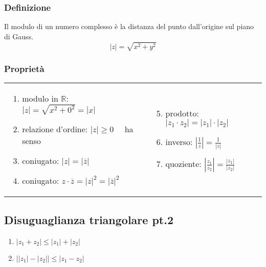 \documentclass[a4paper]{article}
\begin{document}
\subsubsection*{Definizione}
Il modulo di un numero complesso è la distanza del punto dall'origine sul piano di Gauss.
\[ \left| z \right| = \sqrt{x^2 + y^2}\]

\subsubsection*{Proprietà}
\begin{center}
	\begin{tabular}{m{7cm} m{7cm}}
		\begin{enumerate}
			\item modulo in \(\mathbb{R}\): \(\left| z \right| = \sqrt{x^2 + 0^2} = \left| x \right|\)
			\item relazione d'ordine: \(\left| z \right| \geq 0 \quad\) ha senso
			\item coniugato: \(\left| z \right| = \left| \overline{z} \right|\)
			\item coniugato: \(z \cdot \overline{z} = \left|z\right|^2 = \left|\overline{z}\right|^2\)
		\end{enumerate}
		&
		\begin{enumerate}
			\setcounter{enumi}{4}
			\item prodotto: \(\left| z_1 \cdot z_2 \right| = \left| z_1 \right| \cdot \left| z_2 \right|\)
			\item inverso: \(\displaystyle \left| \frac{1}{z} \right| = \frac{1}{\left| z \right|}\)
			\item quoziente: \(\displaystyle \left| \frac{z_1}{z_2} \right| = \frac{\left| z_1 \right|}{\left| z_2 \right|}\)
		\end{enumerate}
	\end{tabular}
\end{center}

\subsection{Disuguaglianza triangolare pt.2} \label{disugTriang}
\begin{enumerate}
	\item \(\left| z_1 + z_2 \right| \leq \left| z_1 \right| + \left| z_2 \right|\)
	\item \(\left| \left| z_1 \right| - \left| z_2 \right| \right| \leq \left| z_1 - z_2 \right|\)
\end{enumerate}
\end{document}
